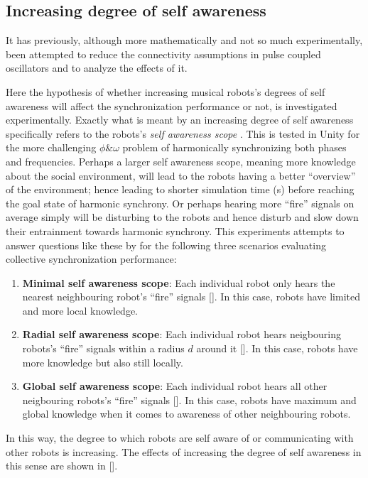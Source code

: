 	
	\subsection{Increasing degree of self awareness}
	
	It has previously, although more mathematically and not so much experimentally, been attempted to reduce the connectivity assumptions in pulse coupled oscillators \cite{minimally_connected_pcos} and to analyze the effects of it.
	
	Here the hypothesis of whether increasing musical robots's degrees of self awareness will affect the synchronization performance or not, is investigated experimentally. Exactly what is meant by an increasing degree of self awareness specifically refers to the robots's \textit{self awareness scope} \cite{sacs17_ch3}. This is tested in Unity for the more challenging $\phi \& \omega$ problem of harmonically synchronizing both phases and frequencies. Perhaps a larger self awareness scope, meaning more knowledge about the social environment, will lead to the robots having a better ``overview'' of the environment; hence leading to shorter simulation time (s) before reaching the goal state of harmonic synchrony. Or perhaps hearing more ``fire'' signals on average simply will be disturbing to the robots and hence disturb and slow down their entrainment towards harmonic synchrony. This experiments attempts to answer questions like these by for the following three scenarios evaluating collective synchronization performance:
	
	\begin{enumerate}
		\item \textbf{Minimal self awareness scope}: Each individual robot only hears the nearest neighbouring robot's ``fire'' signals []. In this case, robots have limited and more local knowledge.
		\item \textbf{Radial self awareness scope}: Each individual robot hears neigbouring robots's ``fire'' signals within a radius $d$ around it []. In this case, robots have more knowledge but also still locally.
		\item \textbf{Global self awareness scope}: Each individual robot hears all other neigbouring robots's ``fire'' signals []. In this case, robots have maximum and global knowledge when it comes to awareness of other neighbouring robots.
	\end{enumerate}
	
	In this way, the degree to which robots are self aware of or communicating with other robots is increasing. The effects of increasing the degree of self awareness in this sense are shown in [].
	
